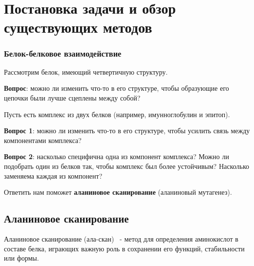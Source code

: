 \chapter{Постановка задачи и обзор существующих методов}
\subsection{Белок-белковое взаимодействие}
Рассмотрим белок, имеющий четвертичную структуру.

\textbf{Вопрос}: можно ли изменить что-то в его структуре, чтобы образующие его цепочки были лучше сцеплены между собой?

Пусть есть комплекс из двух белков (например, имунноглобулин и эпитоп).

\textbf{Вопрос 1}: можно ли изменить что-то в его структуре, чтобы усилить связь между компонентами комплекса?

\textbf{Вопрос 2}: насколько специфична одна из компонент комплекса?  Можно ли подобрать один из белков так, чтобы комплекс был более устойчивым? Насколько заменяема каждая из компонент?

Ответить нам поможет \textbf{аланиновое сканирование} (аланиновый мутагенез).
\section{Аланиновое сканирование}
Аланиновое сканирование (ала-скан)~\cite{alascan2001} - метод для определения аминокислот в составе белка, играющих важную роль в сохранении его функций, стабильности или формы.
\begin{figure}
\end{figure}

